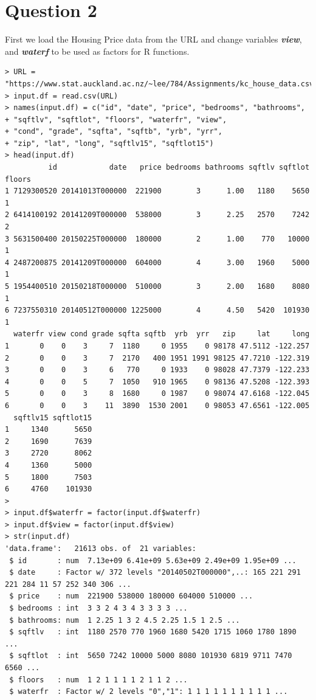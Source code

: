 \documentclass{article}%
\begin{document}
\section{Question 2}
First we load the Housing Price data from the URL and change variables \emph{\textbf{view}}, and \emph{\textbf{waterf}} to be used as factors for R functions.
\begin{verbatim}
> URL = "https://www.stat.auckland.ac.nz/~lee/784/Assignments/kc_house_data.csv"
> input.df = read.csv(URL)
> names(input.df) = c("id", "date", "price", "bedrooms", "bathrooms",
+ "sqftlv", "sqftlot", "floors", "waterfr", "view",
+ "cond", "grade", "sqfta", "sqftb", "yrb", "yrr",
+ "zip", "lat", "long", "sqftlv15", "sqftlot15")
> head(input.df)
          id            date   price bedrooms bathrooms sqftlv sqftlot floors
1 7129300520 20141013T000000  221900        3      1.00   1180    5650      1
2 6414100192 20141209T000000  538000        3      2.25   2570    7242      2
3 5631500400 20150225T000000  180000        2      1.00    770   10000      1
4 2487200875 20141209T000000  604000        4      3.00   1960    5000      1
5 1954400510 20150218T000000  510000        3      2.00   1680    8080      1
6 7237550310 20140512T000000 1225000        4      4.50   5420  101930      1
  waterfr view cond grade sqfta sqftb  yrb  yrr   zip     lat     long
1       0    0    3     7  1180     0 1955    0 98178 47.5112 -122.257
2       0    0    3     7  2170   400 1951 1991 98125 47.7210 -122.319
3       0    0    3     6   770     0 1933    0 98028 47.7379 -122.233
4       0    0    5     7  1050   910 1965    0 98136 47.5208 -122.393
5       0    0    3     8  1680     0 1987    0 98074 47.6168 -122.045
6       0    0    3    11  3890  1530 2001    0 98053 47.6561 -122.005
  sqftlv15 sqftlot15
1     1340      5650
2     1690      7639
3     2720      8062
4     1360      5000
5     1800      7503
6     4760    101930
>
> input.df$waterfr = factor(input.df$waterfr)
> input.df$view = factor(input.df$view)
> str(input.df)
'data.frame':   21613 obs. of  21 variables:
 $ id       : num  7.13e+09 6.41e+09 5.63e+09 2.49e+09 1.95e+09 ...
 $ date     : Factor w/ 372 levels "20140502T000000",..: 165 221 291 221 284 11 57 252 340 306 ...
 $ price    : num  221900 538000 180000 604000 510000 ...
 $ bedrooms : int  3 3 2 4 3 4 3 3 3 3 ...
 $ bathrooms: num  1 2.25 1 3 2 4.5 2.25 1.5 1 2.5 ...
 $ sqftlv   : int  1180 2570 770 1960 1680 5420 1715 1060 1780 1890 ...
 $ sqftlot  : int  5650 7242 10000 5000 8080 101930 6819 9711 7470 6560 ...
 $ floors   : num  1 2 1 1 1 1 2 1 1 2 ...
 $ waterfr  : Factor w/ 2 levels "0","1": 1 1 1 1 1 1 1 1 1 1 ...

\end{verbatim}
\end{document}
